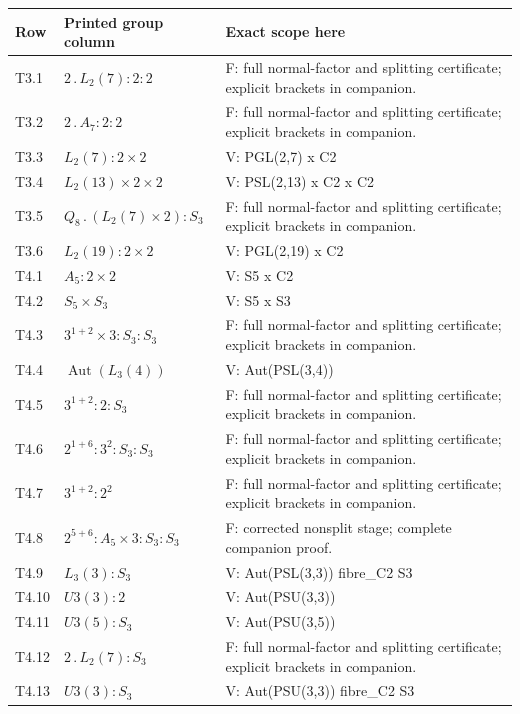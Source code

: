 \begin{longtable}{@{}lp{.40\linewidth}>{\raggedright\arraybackslash}p{.46\linewidth}@{}}
\toprule Row & Printed group column & Exact scope here\\\midrule\endhead
T3.1 & $2 \mathbin{.} L_{2}(7) : 2 : 2$ & F: full normal-factor and splitting certificate; explicit brackets in companion.\\
T3.2 & $2 \mathbin{.} A_{7} : 2 : 2$ & F: full normal-factor and splitting certificate; explicit brackets in companion.\\
T3.3 & $L_{2}(7) : 2 \times 2$ & V: PGL(2,7) x C2\\
T3.4 & $L_{2}(13) \times 2 \times 2$ & V: PSL(2,13) x C2 x C2\\
T3.5 & $Q_{8} \mathbin{.} (L_{2}(7) \times 2) : S_{3}$ & F: full normal-factor and splitting certificate; explicit brackets in companion.\\
T3.6 & $L_{2}(19) : 2 \times 2$ & V: PGL(2,19) x C2\\
T4.1 & $A_{5} : 2 \times 2$ & V: S5 x C2\\
T4.2 & $S_{5} \times S_{3}$ & V: S5 x S3\\
T4.3 & $3^{1+2} \times 3 : S_{3} : S_{3}$ & F: full normal-factor and splitting certificate; explicit brackets in companion.\\
T4.4 & $\operatorname{Aut}(L_{3}(4))$ & V: Aut(PSL(3,4))\\
T4.5 & $3^{1+2} : 2 : S_{3}$ & F: full normal-factor and splitting certificate; explicit brackets in companion.\\
T4.6 & $2^{1+6} : 3^2 : S_{3} : S_{3}$ & F: full normal-factor and splitting certificate; explicit brackets in companion.\\
T4.7 & $3^{1+2} : 2^2$ & F: full normal-factor and splitting certificate; explicit brackets in companion.\\
T4.8 & $2^{5+6} : A_{5} \times 3 : S_{3} : S_{3}$ & F: corrected nonsplit stage; complete companion proof.\\
T4.9 & $L_{3}(3) : S_{3}$ & V: Aut(PSL(3,3)) fibre\_C2 S3\\
T4.10 & $U3(3) : 2$ & V: Aut(PSU(3,3))\\
T4.11 & $U3(5) : S_{3}$ & V: Aut(PSU(3,5))\\
T4.12 & $2 \mathbin{.} L_{2}(7) : S_{3}$ & F: full normal-factor and splitting certificate; explicit brackets in companion.\\
T4.13 & $U3(3) : S_{3}$ & V: Aut(PSU(3,3)) fibre\_C2 S3\\

\end{longtable}
